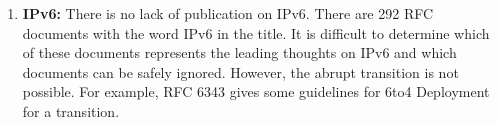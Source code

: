 \begin{enumerate}
\item
\textbf{IPv6:}
There is no lack of publication on IPv6.  There are 292 RFC documents
with the word IPv6 in the title.  It is difficult to determine which
of these documents represents the leading thoughts on IPv6 and which
documents can be safely ignored.  However, the abrupt transition
is not possible. For example, RFC 6343 gives some guidelines for
6to4 Deployment for a transition.
\end{enumerate}
